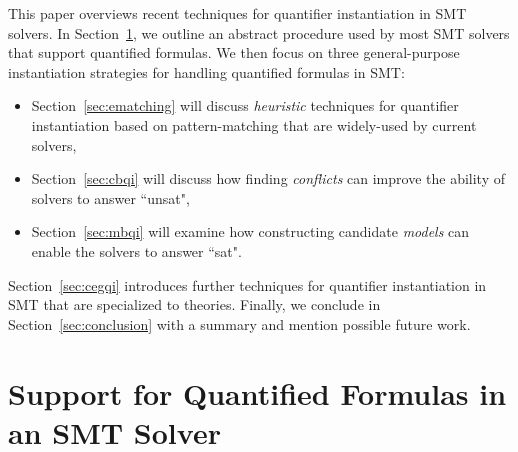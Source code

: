 \documentclass[oribibl]{llncs}
\begin{document}
This paper overviews recent techniques for quantifier instantiation in SMT solvers.
In Section~\ref{sec:quant}, we outline an abstract procedure used by most SMT solvers that support quantified formulas.
We then focus on three general-purpose instantiation strategies for handling quantified formulas in SMT:
\begin{itemize}
\item Section~\ref{sec:ematching} will discuss \emph{heuristic} techniques for quantifier instantiation based on pattern-matching that
are widely-used by current solvers,
\item Section~\ref{sec:cbqi} will discuss how finding \emph{conflicts} can improve the ability of solvers to answer ``unsat",
\item Section~\ref{sec:mbqi} will examine how constructing candidate \emph{models} can enable the solvers to answer ``sat".
\end{itemize} 
Section~\ref{sec:cegqi} introduces further techniques for quantifier instantiation in SMT that 
are specialized to theories.
Finally, we conclude in Section~\ref{sec:conclusion} with a summary and mention possible future work.

\section{Support for Quantified Formulas in an SMT Solver}
\label{sec:quant}
\end{document}
